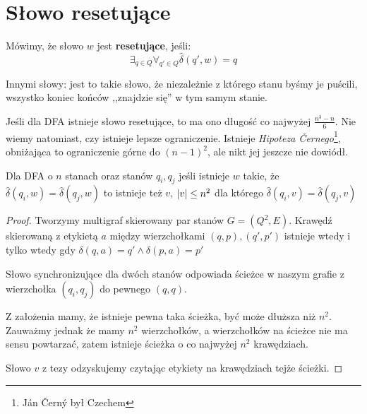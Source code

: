 \section{Słowo resetujące}
\begin{definition}
	Mówimy, że słowo \(w\) jest \textbf{resetujące}, jeśli:
	\[
		\exists_{q \in Q} \forall_{q' \in Q} \hat\delta(q',w) = q
	\]
\end{definition}

Innymi słowy: jest to takie słowo, że niezależnie z którego stanu byśmy je puścili, wszystko koniec końców ,,znajdzie się'' w tym samym stanie.

Jeśli dla DFA istnieje słowo resetujące, to ma ono długość co najwyżej \(\frac{n^3 -n}{6}\). Nie wiemy natomiast, czy istnieje lepsze ograniczenie. Istnieje \textit{Hipoteza Černego}\footnote{Ján Černý był Czechem}, obniżająca to ograniczenie górne do \((n-1)^2\), ale nikt jej jeszcze nie dowiódł.

\begin{lemma}
	Dla DFA o \( n \) stanach oraz stanów \( q_i, q_j \) jeśli istnieje \( w \) takie, że \( \widehat \delta(q_i, w) = \widehat \delta(q_j, w) \) to istnieje też \( v \), \( \card{v} \leq n^2 \) dla którego \( \widehat \delta(q_i, v) = \widehat \delta(q_j, v) \)
\end{lemma}
\begin{proof}
	Tworzymy multigraf skierowany par stanów \( G = (Q^2, E) \).
	Krawędź skierowaną z etykietą \( a \) między wierzchołkami \( (q, p), (q', p') \) istnieje wtedy i tylko wtedy gdy \( \delta(q, a) = q' \land \delta(p, a) = p' \)

	Słowo synchronizujące dla dwóch stanów odpowiada ścieżce w naszym grafie z wierzchołka \( (q_i, q_j) \) do pewnego \( (q, q) \).

	Z założenia mamy, że istnieje pewna taka ścieżka, być może dłuższa niż \( n^2 \). Zauważmy jednak że mamy \( n^2 \) wierzchołków, a wierzchołków na ścieżce nie ma sensu powtarzać, zatem istnieje ścieżka o co najwyżej \( n^2 \) krawędziach.

	Słowo \( v \) z tezy odzyskujemy czytając etykiety na krawędziach tejże ścieżki.
\end{proof}


